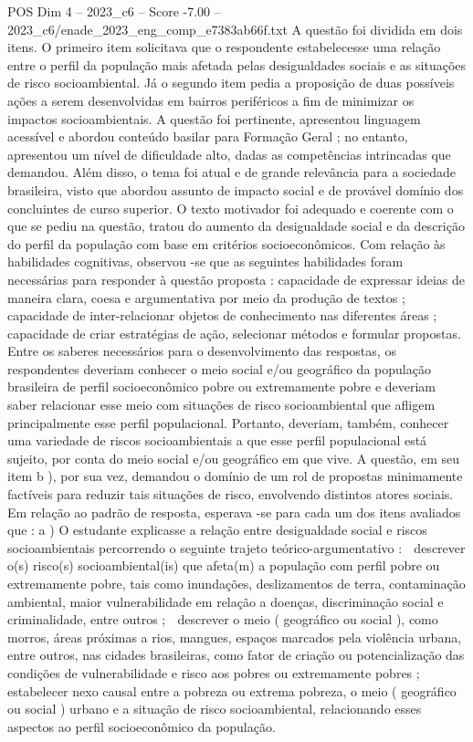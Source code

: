 \begin{textsample}{POS Dim 4 – 2023\_c6 – Score -7.00 – 2023\_c6/enade\_2023\_eng\_comp\_e7383ab66f.txt}
A questão foi dividida em dois itens.
O primeiro item solicitava que o respondente estabelecesse uma relação entre o perfil da população mais afetada pelas desigualdades sociais e as situações de risco socioambiental.
Já o segundo item pedia a proposição de duas possíveis ações a serem desenvolvidas em bairros periféricos a fim de minimizar os impactos socioambientais.
A questão foi pertinente, apresentou linguagem acessível e abordou conteúdo basilar para Formação Geral ; no entanto, apresentou um nível de dificuldade alto, dadas as competências intrincadas que demandou.
Além disso, o tema foi atual e de grande relevância para a sociedade brasileira, visto que abordou assunto de impacto social e de provável domínio dos concluintes de curso superior.
O texto motivador foi adequado e coerente com o que se pediu na questão, tratou do aumento da desigualdade social e da descrição do perfil da população com base em critérios socioeconômicos.
Com relação às habilidades cognitivas, observou -se que as seguintes habilidades foram necessárias para responder à questão proposta : capacidade de expressar ideias de maneira clara, coesa e argumentativa por meio da produção de textos ; capacidade de inter-relacionar objetos de conhecimento nas diferentes áreas ; capacidade de criar estratégias de ação, selecionar métodos e formular propostas.
Entre os saberes necessários para o desenvolvimento das respostas, os respondentes deveriam conhecer o meio social e/ou geográfico da população brasileira de perfil socioeconômico pobre ou extremamente pobre e deveriam saber relacionar esse meio com situações de risco socioambiental que afligem principalmente esse perfil populacional.
Portanto, deveriam, também, conhecer uma variedade de riscos socioambientais a que esse perfil populacional está sujeito, por conta do meio social e/ou geográfico em que vive.
A questão, em seu item b ), por sua vez, demandou o domínio de um rol de propostas minimamente factíveis para reduzir tais situações de risco, envolvendo distintos atores sociais.
Em relação ao padrão de resposta, esperava -se para cada um dos itens avaliados que : a ) O estudante explicasse a relação entre desigualdade social e riscos socioambientais percorrendo o seguinte trajeto teórico-argumentativo :  descrever o(s) risco(s) socioambiental(is) que afeta(m) a população com perfil pobre ou extremamente pobre, tais como inundações, deslizamentos de terra, contaminação ambiental, maior vulnerabilidade em relação a doenças, discriminação social e criminalidade, entre outros ;  descrever o meio ( geográfico ou social ), como morros, áreas próximas a rios, mangues, espaços marcados pela violência urbana, entre outros, nas cidades brasileiras, como fator de criação ou potencialização das condições de vulnerabilidade e risco aos pobres ou extremamente pobres ;  estabelecer nexo causal entre a pobreza ou extrema pobreza, o meio ( geográfico ou social ) urbano e a situação de risco socioambiental, relacionando esses aspectos ao perfil socioeconômico da população.

\end{textsample}
